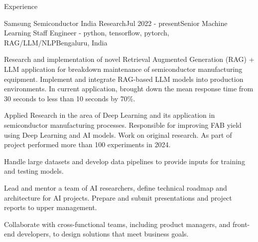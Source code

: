 \documentclass{resume}
\begin{document}
  \begin{rSection}{Experience}

    \begin{rSubsection}{Samsung Semiconductor India Research}{Jul 2022 - present}{Senior Machine Learning Staff Engineer - python, tensorflow, pytorch, RAG/LLM/NLP}{Bengaluru, India}
    \item Research and implementation of novel Retrieval Augmented Generation (RAG) + LLM application for breakdown maintenance of semiconductor manufacturing equipment. Implement and integrate RAG-based LLM models into production environments. In current application, brought down the mean response time from 30 seconds to less than 10 seconds by 70\%.
    \item Applied Research in the area of Deep Learning and its application in semiconductor manufacturing processes. Responsible for improving FAB yield using Deep Learning and AI models. Work on original research. As part of project performed more than 100 experiments in 2024.
    \item Handle large datasets and develop data pipelines to provide inputs for training and testing models.
    \item Lead and mentor a team of AI researchers, define technical roadmap and architecture for AI projects. Prepare and submit presentations and project reports to upper management.
    \item Collaborate with cross-functional teams, including product managers, and front-end developers, to design solutions that meet business goals.
    \end{rSubsection}
  

\end{rSection}
\end{document}
